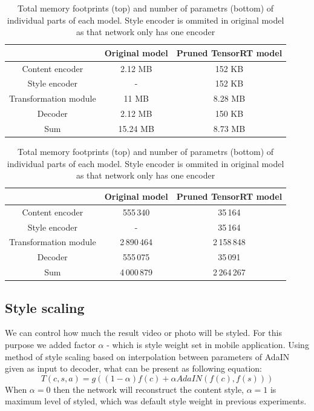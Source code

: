 \documentclass[../Main.tex]{subfiles}
\begin{document}
\begin{table}
\begin{center}

\begin{tabular}{|c|c|c|}
\hline
                      &  Original model & Pruned TensorRT model \\
\hline
Content encoder       &  2.12 MB        & 152 KB   \\
\hline
Style encoder         &  -              & 152 KB   \\
\hline
Transformation module &  11 MB          & 8.28 MB  \\
\hline
Decoder               &  2.12 MB        & 150 KB   \\
\hline
Sum                   &  15.24 MB       & 8.73 MB  \\
\hline
\end{tabular}
\vspace{1em}

\begin{tabular}{|c|c|c|}
\hline
                      &  Original model & Pruned TensorRT model \\
\hline
Content encoder       &   555\,340        &  35\,164       \\
\hline
Style encoder         &  -              &  35\,164       \\
\hline
Transformation module &   2\,890\,464     &   2\,158\,848  \\
\hline
Decoder               &   555\,075       &   35\,091      \\
\hline
Sum                   &   4\,000\,879       &    2\,264\,267   \\
\hline
\end{tabular}

\end{center}
\caption{\label{table:memory} Total memory footprints (top) and number of parametrs (bottom)
    of individual parts of each model. Style encoder
    is ommited in original model as that network only has one encoder
    }
\end{table}

\subsection{Style scaling}
We can control how much the result video or photo will be styled. For this purpose we added factor $\alpha$ -  which is style weight set in mobile application. Using method of style scaling based on interpolation between parameters of AdaIN given as input to decoder, what can be present as following equation: $$T(c,s,a) = g((1-\alpha)f(c)+\alpha AdaIN(f(c),f(s)))$$ When $\alpha= 0$  then the network will reconstruct the content style, $\alpha = 1$ is maximum level of styled, which was default style weight in previous experiments. 
\end{document}
